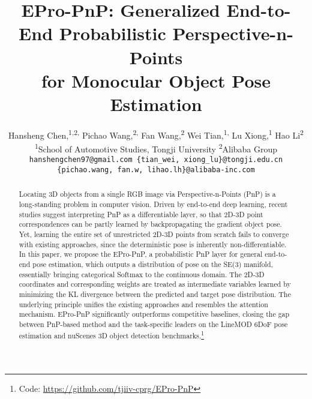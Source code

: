 \documentclass[10pt,twocolumn,letterpaper]{article}
\begin{document}
\title{EPro-PnP: Generalized End-to-End Probabilistic Perspective-n-Points \\
for Monocular Object Pose Estimation}

\author{
Hansheng Chen,\negmedspace\textsuperscript{1,2,\textasteriskcentered}
Pichao Wang,\negmedspace\textsuperscript{2,\textdagger}
Fan Wang,\negmedspace\textsuperscript{2}
Wei Tian,\negmedspace\textsuperscript{1,\textdagger}
Lu Xiong,\negmedspace\textsuperscript{1}
Hao Li\textsuperscript{2} \\
\textsuperscript{1}School of Automotive Studies, Tongji University \qquad \textsuperscript{2}Alibaba Group \\
{\tt\small
hanshengchen97@gmail.com \{tian\_wei, xiong\_lu\}@tongji.edu.cn
} \\
{\tt\small
\{pichao.wang, fan.w, lihao.lh\}@alibaba-inc.com
}
}

\maketitle

\begingroup
\renewcommand{\thefootnote}{\fnsymbol{footnote}}
\endgroup

\begin{abstract}

\setcounter{footnote}{2}

Locating 3D objects from a single RGB image via Perspective-n-Points (PnP) is a long-standing problem in computer vision. Driven by end-to-end deep learning, recent studies suggest interpreting PnP as a differentiable layer, so that 2D-3D point correspondences can be partly learned by backpropagating the gradient \wrt object pose. Yet, learning the entire set of unrestricted 2D-3D points from scratch fails to converge with existing approaches, since the deterministic pose is inherently non-differentiable.
In this paper, we propose the EPro-PnP, a probabilistic PnP layer for general end-to-end pose estimation, which outputs a distribution of pose on the SE(3) manifold, essentially bringing categorical Softmax to the continuous domain.
The 2D-3D coordinates and corresponding weights are treated as intermediate variables learned by minimizing the KL divergence between the predicted and target pose distribution.
The underlying principle unifies the existing approaches and resembles the attention mechanism.
EPro-PnP significantly outperforms competitive baselines, closing the gap between PnP-based method and the task-specific leaders on the LineMOD 6DoF pose estimation and nuScenes 3D object detection benchmarks.\footnote{Code: \url{https://github.com/tjiiv-cprg/EPro-PnP}}
   
\end{abstract}
\end{document}
